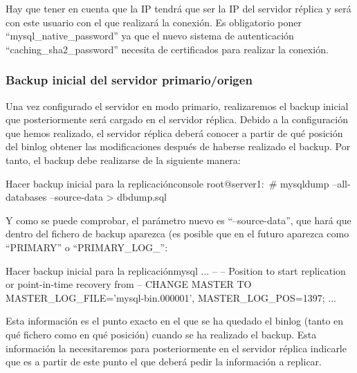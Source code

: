 Hay que tener en cuenta que la IP tendrá que ser la IP del servidor réplica y será con este usuario con el que realizará la conexión. Es obligatorio poner “mysql\_native\_password” ya que el nuevo sistema de autenticación “caching\_sha2\_password” necesita de certificados para realizar la conexión.


\subsubsection{Backup inicial del servidor primario/origen}
Una vez configurado el servidor en modo primario, realizaremos el backup inicial que posteriormente será cargado en el servidor réplica. Debido a la configuración que hemos realizado, el servidor réplica deberá conocer a partir de qué posición del binlog obtener las modificaciones después de haberse realizado el backup. Por tanto, el backup debe realizarse de la siguiente manera:

\begin{mycode}{Hacer backup inicial para la replicación}{console}{}
root@server1:~# mysqldump --all-databases --source-data > dbdump.sql
\end{mycode}

Y como se puede comprobar, el parámetro nuevo es “--source-data”, que hará que dentro del fichero de backup aparezca (es posible que en el futuro aparezca como “PRIMARY” o “PRIMARY\_LOG\_”:


\begin{mycode}{Hacer backup inicial para la replicación}{mysql}{}
...
--
-- Position to start replication or point-in-time recovery from
--
CHANGE MASTER TO MASTER_LOG_FILE='mysql-bin.000001', MASTER_LOG_POS=1397;
...
\end{mycode}

Esta información es el punto exacto en el que se ha quedado el binlog (tanto en qué fichero como en qué posición) cuando se ha realizado el backup. Esta información la necesitaremos para posteriormente en el servidor réplica indicarle que es a partir de este punto el que deberá pedir la información a replicar.
